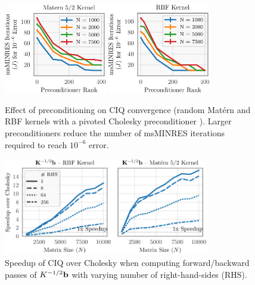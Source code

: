 \begin{figure}[t!]
	\centering
	\includegraphics[width=0.4\textwidth]{figures/precond_result.pdf}
  \quad
	\includegraphics[width=0.4\textwidth]{figures/precond_result_rbf.pdf}
  \caption[
    Effect of preconditioning on CIQ convergence.
  ]{
    Effect of preconditioning on CIQ convergence (random Mat\'ern and RBF kernels with a pivoted Cholesky preconditioner \citep{gardner2018gpytorch}).
    Larger preconditioners reduce the number of msMINRES iterations required to reach $10^{-6}$ error.
  }
  \label{fig:precond_result}
\end{figure}

\begin{figure}[t!]
	\centering
	\includegraphics[width=0.8\textwidth]{figures/timing.pdf}
  \caption[
    Speedup of CIQ over Cholesky.
  ]{
    Speedup of CIQ over Cholesky when computing forward/backward passes of $K^{-1/2} \mathbf{b}$ with varying number of right-hand-sides (RHS).
  }
  \label{fig:timing}
\end{figure}

